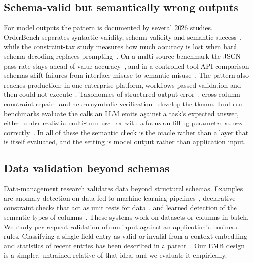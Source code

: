 \documentclass[conference]{IEEEtran}
\begin{document}
\subsection{Schema-valid but semantically wrong outputs}
For model outputs the pattern is documented by several 2026 studies. OrderBench separates syntactic
validity, schema validity and semantic success~\cite{li2026orderbench}, while the constraint-tax study
measures how much accuracy is lost when hard schema decoding replaces
prompting~\cite{ray2026constrainttax}. On a multi-source benchmark the JSON pass rate stays ahead of
value accuracy~\cite{singh2026sob}, and in a controlled tool-API comparison schemas shift failures from
interface misuse to semantic misuse~\cite{sigdel2026schemafirst}. The pattern also reaches production:
in one enterprise platform, workflows passed validation and then could not
execute~\cite{wrenn2026enterprise}. Taxonomies of
structured-output error~\cite{song2026structuredoutput}, cross-column constraint
repair~\cite{zhao2026constraintaware} and neuro-symbolic
verification~\cite{sigloch2026neurosymbolic} develop the theme. Tool-use benchmarks evaluate the calls
an LLM emits against a task's expected answer, either under realistic multi-turn
use~\cite{yu2026wildtoolbench} or with a focus on filling parameter values
correctly~\cite{yu2026parambench}. In all of these the semantic check is the oracle rather than a layer
that is itself evaluated, and the setting is model output rather than application input.

\subsection{Data validation beyond schemas}
Data-management research validates data beyond structural schemas. Examples are anomaly detection on
data fed to machine-learning pipelines~\cite{breck2019datavalidation}, declarative constraint checks
that act as unit tests for data~\cite{schelter2018deequ}, and learned detection of the semantic types
of columns~\cite{hulsebos2019sherlock}. These systems work on datasets or columns in batch. We study
per-request validation of one input against an application's business rules. Classifying a single field
entry as valid or invalid from a context embedding and statistics of recent entries has been described
in a patent~\cite{banerjee2025contextembedding}. Our EMB design is a simpler, untrained relative of that
idea, and we evaluate it empirically.
\end{document}
